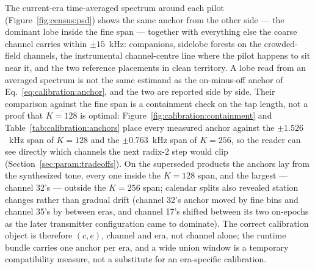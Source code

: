 The current-era time-averaged spectrum around each pilot
(Figure~\ref{fig:census:psd}) shows the same anchor from the other side --- the
dominant lobe inside the fine span --- together with everything else the coarse
channel carries within $\pm 15$~kHz: companions, sidelobe forests on the
crowded-field channels, the instrumental channel-centre line where the pilot
happens to sit near it, and the two reference placements in clean territory.  A
lobe read from an averaged spectrum is not the same estimand as the
on-minus-off anchor of Eq.~\eqref{eq:calibration:anchor}, and the two are
reported side by side.  Their comparison against the fine span is a containment check on the
tap length, not a proof that $K = 128$ is optimal: Figure~\ref{fig:calibration:containment}
and Table~\ref{tab:calibration:anchors} place every measured anchor against
the $\pm 1.526$~kHz span of $K = 128$ and the $\pm 0.763$~kHz span of
$K = 256$, so the reader can see directly which channels the next radix-2 step
would clip (Section~\ref{sec:param:tradeoffs}).
On the superseded products the anchors lay  from the synthesized tone, every one inside the $K = 128$ span,
and the largest --- channel 32's --- outside the $K = 256$ span; calendar
splits also revealed station changes rather than gradual drift (channel 32's
anchor moved by  fine bins and channel 35's by  between
eras, and channel 17's shifted between its two on-epochs as the later
transmitter configuration came to dominate).  The correct calibration object is
therefore $(c, e)$, channel and era, not channel alone; the runtime bundle
carries one anchor per era, and a wide union window is a temporary
compatibility measure, not a substitute for an era-specific calibration.


